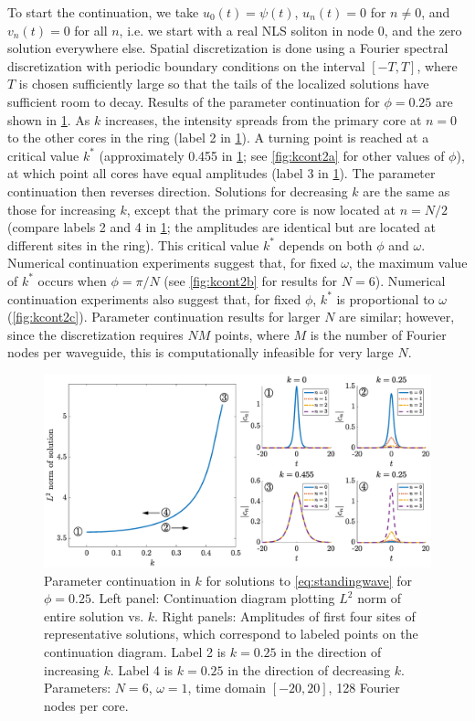 \documentclass[11pt,reqno]{amsart}
\begin{document}
To start the continuation, we take $u_0(t) = \psi(t)$, $u_n(t) = 0$ for $n \neq 0$, and $v_n(t) = 0$ for all $n$, i.e. we start with a real NLS soliton in node 0, and the zero solution everywhere else. Spatial discretization is done using a Fourier spectral discretization with periodic boundary conditions on the interval $[-T,T]$, where $T$ is chosen sufficiently large so that the tails of the localized solutions have sufficient room to decay. Results of the parameter continuation for $\phi = 0.25$ are shown in \cref{fig:kcont}. As $k$ increases, the intensity spreads from the primary core at $n=0$ to the other cores in the ring (label 2 in \cref{fig:kcont}). A turning point is reached at a critical value $k^*$ (approximately 0.455 in \cref{fig:kcont}; see \cref{fig:kcont2a} for other values of $\phi$), at which point all cores have equal amplitudes (label 3 in \cref{fig:kcont}). The parameter continuation then reverses direction. Solutions for decreasing $k$ are the same as those for increasing $k$, except that the primary core is now located at $n=N/2$ (compare labels 2 and 4 in \cref{fig:kcont}; the amplitudes are identical but are located at different sites in the ring). This critical value $k^*$ depends on both $\phi$ and $\omega$. Numerical continuation experiments suggest that, for fixed $\omega$, the maximum value of $k^*$ occurs when $\phi = \pi/N$ (see \cref{fig:kcont2b} for results for $N=6$). Numerical continuation experiments also suggest that, for fixed $\phi$, $k^*$ is proportional to $\omega$ (\cref{fig:kcont2c}). Parameter continuation results for larger $N$ are similar; however, since the discretization requires $NM$ points, where $M$ is the number of Fourier nodes per waveguide, this is computationally infeasible for very large $N$.

\begin{figure}
    \centering
    \includegraphics[width=16cm]{contdiag.eps}
    \caption{Parameter continuation in $k$ for solutions to \cref{eq:standingwave} for $\phi=0.25$. Left panel: Continuation diagram plotting $L^2$ norm of entire solution vs. $k$. Right panels: Amplitudes of first four sites of representative solutions, which correspond to labeled points on the continuation diagram. Label 2 is $k=0.25$ in the direction of increasing $k$. Label 4 is $k=0.25$ in the direction of decreasing $k$. Parameters: $N=6$, $\omega=1$, time domain $[-20,20]$, 128 Fourier nodes per core.}
    \label{fig:kcont}
\end{figure}
\end{document}

